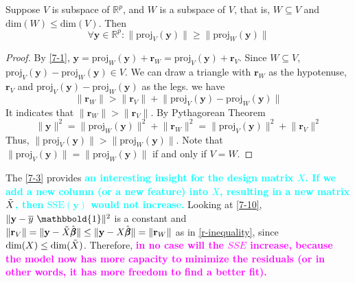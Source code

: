 \begin{Thm}\label{7-3}
    Suppose $V$ is subspace of $\mathbb{R}^p$, and $W$ is a subspace of $V$, that is, $W\subseteq V$ and $\text{dim}(W) \leq \text{dim}(V)$. Then
    \begin{equation}
        \forall \mathbf{y}\in\mathbb{R}^p: \lVert \text{proj}_{V}(\mathbf{y})  \rVert \geq \lVert \text{proj}_{W}(\mathbf{y})  \rVert
    \end{equation}
    \begin{proof}

        By \cref{7-1}, $\mathbf{y} = \text{proj}_{W}(\mathbf{y}) + \mathbf{r}_W = \text{proj}_{V}(\mathbf{y}) + \mathbf{r}_V$.
        Since $W\subseteq V$, $\text{proj}_{V}(\mathbf{y}) - \text{proj}_{W}(\mathbf{y}) \in V$. We can draw a triangle with $\mathbf{r}_W$ as the hypotenuse, $\mathbf{r}_V$ and $\text{proj}_{V}(\mathbf{y}) - \text{proj}_{W}(\mathbf{y})$ as the legs. we have
        \begin{equation}\label{r-inequality}
            \lVert \mathbf{r}_W \rVert > \lVert \mathbf{r}_V \rVert + 
            \lVert \text{proj}_{V}(\mathbf{y}) - \text{proj}_{W}(\mathbf{y}) \rVert
        \end{equation}
        It indicates that $\lVert \mathbf{r}_W \rVert > \lVert \mathbf{r}_V \rVert$. By Pythagorean Theorem
        \begin{equation*}
            \lVert \mathbf{y}\rVert^2 = \lVert \text{proj}_{W}(\mathbf{y})\rVert ^2 + \lVert \mathbf{r}_W \rVert ^2 = \lVert \text{proj}_{V}(\mathbf{y})\rVert ^2 + \lVert \mathbf{r}_V \rVert ^2
        \end{equation*}
        Thus, $\lVert \text{proj}_{V}(\mathbf{y})  \rVert > \lVert \text{proj}_{W}(\mathbf{y})  \rVert$. Note that $\lVert \text{proj}_{V}(\mathbf{y})  \rVert = \lVert \text{proj}_{W}(\mathbf{y})  \rVert$ if and only if $V = W$.
    \end{proof}
\end{Thm}
The \cref{7-3} provides \textbf{\textcolor{cyan}{an interesting insight for the design matrix $X$. If we add a new column (or a new feature) into $X$, resulting in a new matrix $\Tilde{X}$, then $\text{SSE}(\mathbf{y})$ would not increase.}} Looking at \cref{7-10}, $\lVert \mathbf{y} - \overline{y}\ \mathbbold{1} \rVert^2$ is a constant and $\lVert \mathbf{r}_V\rVert = \lVert \mathbf{y} - \Tilde{X}\hat{\pmb{\beta}}\rVert \leq \lVert \mathbf{y} - X\hat{\pmb{\beta}}\rVert = \lVert \mathbf{r}_W\rVert$ as in \cref{r-inequality}, since $\text{dim}(X) \leq \text{dim}(\Tilde{X})$. Therefore, \textbf{\textcolor{magenta}{in no case will the $SSE$ increase, because the model now has more capacity to minimize the residuals (or in other words, it has more freedom to find a better fit).}}
